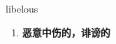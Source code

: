 
\begin{frame}
{\huge libelous}
\begin{center}
\begin{enumerate}\Large
  \item \textbf{恶意中伤的，诽谤的}
\end{enumerate}
\end{center}
\end{frame}
